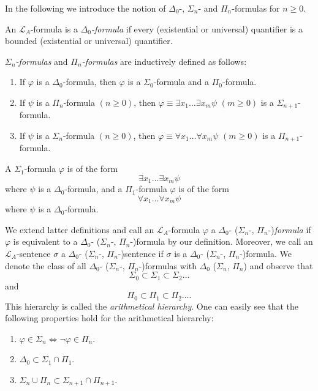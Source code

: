 In the following we introduce the notion of $\Delta_0$-, $\Sigma_n$- and $\Pi_n$-formulas for $n \ge 0$.    

\begin{dfn}
An $\mathcal{L}_A$-formula is a \textit{$\Delta_0$-formula} if every (existential or universal) quantifier is a bounded (existential or universal) quantifier.
\end{dfn}

\begin{dfn}
\textit{$\Sigma_n$-formulas }and \textit{$\Pi_n$-formulas} are inductively defined as follows:
\begin{enumerate}
\item If $\varphi$ is a $\Delta_0$-formula, then $\varphi$ is a $\Sigma_0$-formula and a $\Pi_0$-formula. 
\item If $\psi$ is a $\Pi_n$-formula $(n\ge 0)$, then $\varphi \equiv \exists x_1 \ldots \exists x_m \psi$ $(m \ge 0)$ is a $\Sigma_{n+1}$-formula.
\item If $\psi$ is a $\Sigma_n$-formula $(n\ge 0)$, then $\varphi \equiv \forall x_1 \ldots \forall x_m \psi$ $(m \ge 0)$ is a $\Pi_{n+1}$-formula.
\end{enumerate}
\end{dfn}


A $\Sigma_1$-formula $\varphi$ is of the form 
\[ \exists x_1 \ldots \exists x_m \psi \]
where $\psi$ is a $\Delta_0$-formula, and a $\Pi_1$-formula $\varphi$ is of the form
\[ \forall x_1 \ldots \forall x_m \psi \]
where $\psi$ is a $\Delta_0$-formula. 

We extend latter definitions and call an $\mathcal{L}_A$-formula $\varphi$ a $\Delta_0$- ($\Sigma_n$-, $\Pi_n$-)\textit{formula} if $\varphi$ is equivalent to a $\Delta_0$- ($\Sigma_n$-, $\Pi_n$-)formula by our definition. Moreover, we call an $\mathcal{L}_A$-sentence $\sigma$ a $\Delta_0$- ($\Sigma_n$-, $\Pi_n$-)sentence if $\sigma$ is a $\Delta_0$- ($\Sigma_n$-, $\Pi_n$-)formula. We denote the class of all $\Delta_0$- ($\Sigma_n$-, $\Pi_n$-)formulas with $\Delta_0$ ($\Sigma_n$, $\Pi_n$) and observe that 
\[ \Sigma_0 \subset \Sigma_1 \subset \Sigma_2 \ldots \]
and 
\[ \Pi_0 \subset \Pi_1 \subset \Pi_2 \ldots. \]This hierarchy is called the \textit{arithmetical hierarchy}. One can easily see that the following properties hold for the arithmetical hierarchy:
\begin{enumerate}
\item $\varphi \in \Sigma_n \Leftrightarrow \lnot \varphi \in \Pi_n$.
\item $\Delta_0 \subset \Sigma_1 \cap \Pi_1$.
\item $\Sigma_n \cup \Pi_n \subset \Sigma_{n+1} \cap \Pi_{n+1}$.
\end{enumerate}

